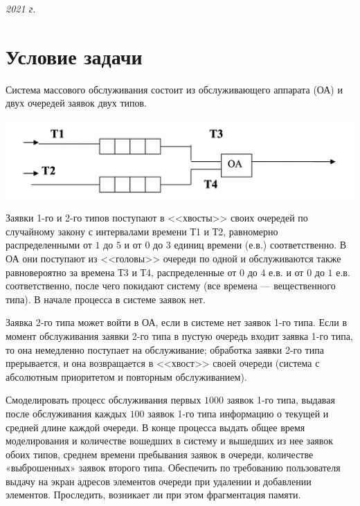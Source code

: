 \documentclass[a4paper,12pt]{extarticle}
\begin{document}
\vspace{7cm}
\begin{center} \textit{2021 г.} \end{center}
\thispagestyle{empty}
\newpage

\tableofcontents
\newpage

\section{Условие задачи}
Система массового обслуживания состоит из обслуживающего аппарата (ОА) и двух очередей заявок двух типов.

\includegraphics[width=\textwidth]{schema.png}

Заявки 1-го и 2-го типов поступают в <<хвосты>> своих очередей по случайному закону с интервалами времени Т1 и Т2, равномерно распределенными от $1$ до $5$ и от $0$ до $3$ единиц времени (е.в.) соответственно. В ОА они поступают из <<головы>> очереди по одной и обслуживаются также равновероятно за времена Т3 и Т4, распределенные от $0$ до $4$ е.в. и от $0$ до $1$ е.в. соответственно, после чего покидают систему (все времена --- вещественного типа). В начале процесса в системе заявок нет.

Заявка 2-го типа может войти в ОА, если в системе нет заявок 1-го типа. Если в момент обслуживания заявки 2-го типа в пустую очередь входит заявка 1-го типа, то она немедленно поступает на обслуживание; обработка заявки 2-го типа прерывается, и она возвращается в <<хвост>> своей очереди (система с абсолютным приоритетом и повторным обслуживанием).

Смоделировать процесс обслуживания первых $1000$ заявок 1-го типа, выдавая после обслуживания каждых $100$ заявок 1-го типа информацию о текущей и средней длине каждой очереди. В конце процесса выдать общее время моделирования и количестве вошедших в систему и вышедших из нее заявок обоих типов, среднем времени пребывания заявок в очереди, количестве «выброшенных» заявок второго типа. Обеспечить по требованию пользователя выдачу на экран адресов элементов очереди при удалении и добавлении элементов. Проследить, возникает ли при этом фрагментация памяти.

\newpage
\end{document}
